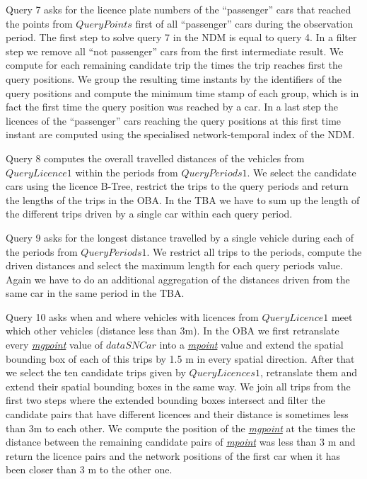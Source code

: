 \documentclass[a4paper]{article}
\newcommand{\dt}[1]{\textsl{\underline{#1}}}
\begin{document}
Query 7 asks for the licence plate numbers of the ``passenger'' cars that reached
the points from $QueryPoints$ first of all ``passenger'' cars during the
observation period. The first step to solve query 7 in the NDM is
equal to query 4. In a filter step we remove all ``not passenger'' cars from the
first intermediate result. We compute for each remaining candidate trip the times
the trip reaches first the query positions. We group the resulting time instants
by the identifiers of the query positions and compute the minimum time stamp of
each group, which is in fact the first time the query position was reached by a
car. In a last step the licences of the ``passenger'' cars reaching the query
positions at this first time instant are computed using the specialised
network-temporal index of the NDM.

Query 8 computes the overall travelled distances of the vehicles from $QueryLicence1$
within the periods from $QueryPeriods1$. We select the candidate cars using the
licence B-Tree, restrict the trips to the query periods and return the lengths of the
trips in the OBA. In the TBA we have to sum up the length of the different
trips driven by a single car within each query period.

Query 9 asks for the longest distance travelled by a single vehicle during each
of the periods from $QueryPeriods1$. We restrict all trips to the periods, compute
the driven distances and select the maximum length for each query periods value.
Again we have to do an additional aggregation of the distances driven from the same
car in the same period in the TBA.

Query 10 asks when and where vehicles with licences from $QueryLicence1$ meet which
other vehicles (distance less than 3m). In the OBA we first retranslate every
\dt{mgpoint} value of $dataSNCar$ into a \dt{mpoint} value and extend the spatial
bounding box of each of this trips by 1.5 m in every spatial direction. After that we
select the ten candidate trips given by $QueryLicences1$, retranslate them and
extend their spatial bounding boxes in the same way. We join all trips from the
first two steps where the extended bounding boxes intersect and filter the
candidate pairs that have different licences and their distance is sometimes
less than 3m to each other. We compute the position of the \dt{mgpoint} at the
times the distance between the remaining candidate pairs of \dt{mpoint} was less
than 3 m and return the licence pairs and the network positions of the first car
when it has been closer than 3 m to the other one.
\end{document}
